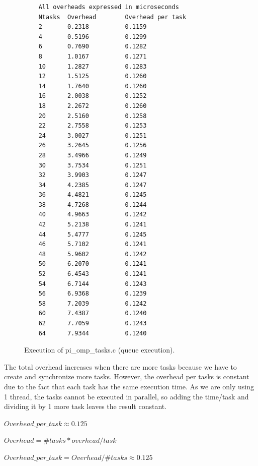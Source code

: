 \documentclass[12pt, a4paper]{article}
\begin{document}
\begin{figure}[H]
\begin{lstlisting}
	All overheads expressed in microseconds
	Ntasks  Overhead        Overhead per task
	2       0.2318          0.1159
	4       0.5196          0.1299
	6       0.7690          0.1282
	8       1.0167          0.1271
	10      1.2827          0.1283
	12      1.5125          0.1260
	14      1.7640          0.1260
	16      2.0038          0.1252
	18      2.2672          0.1260
	20      2.5160          0.1258
	22      2.7558          0.1253
	24      3.0027          0.1251
	26      3.2645          0.1256
	28      3.4966          0.1249
	30      3.7534          0.1251
	32      3.9903          0.1247
	34      4.2385          0.1247
	36      4.4821          0.1245
	38      4.7268          0.1244
	40      4.9663          0.1242
	42      5.2138          0.1241
	44      5.4777          0.1245
	46      5.7102          0.1241
	48      5.9602          0.1242
	50      6.2070          0.1241
	52      6.4543          0.1241
	54      6.7144          0.1243
	56      6.9368          0.1239
	58      7.2039          0.1242
	60      7.4387          0.1240
	62      7.7059          0.1243
	64      7.9344          0.1240
	\end{lstlisting}
	\caption{Execution of pi\_omp\_tasks.c (queue execution).}
	\label{piomptasks}
\end{figure}

The total overhead increases when there are more tasks because we have to create and synchronize more tasks. However, the overhead per tasks is constant due to the fact that each task has the same execution time. As we are only using 1 thread, the tasks cannot be executed in parallel, so adding the time/task and dividing it by 1 more task leaves the result constant.

$ Overhead\_per\_task \approx 0.125 $

$ Overhead = \#tasks * overhead/task $

$ Overhead\_per\_task = Overhead/\#tasks \approx 0.125 $
\end{document}
